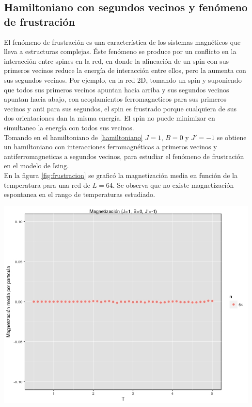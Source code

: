 \documentclass[%
 reprint,
 amsmath,amssymb,
 aps,
spanish]{revtex4-1}
\begin{document}
\subsection{Hamiltoniano con segundos vecinos y fenómeno de frustración}
El fenómeno de frustración es una característica de los sistemas magnéticos que lleva a estructuras complejas. Éste fenómeno se produce por un conflicto en la interacción entre spines en la red, en 
donde la alineación de un spin con sus primeros vecinos reduce la energía de interacción entre ellos, pero la aumenta con sus segundos vecinos. Por ejemplo, en la red 2D, tomando un spin y suponiendo 
que todos sus primeros vecinos apuntan hacia arriba y sus segundos vecinos apuntan hacia abajo, con acoplamientos ferromagneticos para sus primeros vecinos y anti para sus segundos, el spin es 
frustrado porque cualquiera de sus dos orientaciones dan la misma energía. El spin no puede minimizar en simultaneo la energía con todos sus vecinos.\\
Tomando en el hamiltoniano de \ref{hamiltoniano} $J=1$, $B=0$ y $J'=-1$ se obtiene un hamiltoniano con interacciones ferromagnéticas a primeros vecinos y antiferromagneticas a segundos vecinos, 
para estudiar el fenómeno de frustración en el modelo de Ising.\\ 
En la figura \ref{fig:frustracion} se graficó la magnetización media en función de la temperatura para una red de $L=64$. Se observa que no existe magnetización espontanea en el rango de temperaturas 
estudiado.

\begin{minipage}{0.45\textwidth}									
\centering
\includegraphics[totalheight=0.25\textheight]{imagenes/frustracion/magnetizacion}
\label{fig:frustracion}
\end{minipage}
\end{document}

